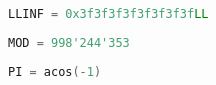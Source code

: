 \begin{lstlisting}[language=C++]
LLINF = 0x3f3f3f3f3f3f3f3fLL
\end{lstlisting}

\begin{lstlisting}[language=C++]
MOD = 998'244'353
\end{lstlisting}

\begin{lstlisting}[language=C++]
PI = acos(-1)
\end{lstlisting}
